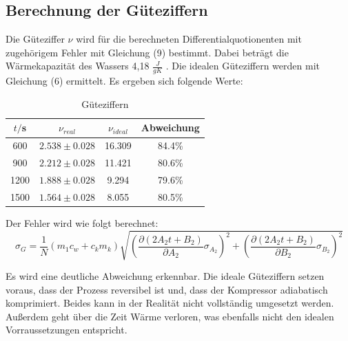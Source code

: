 \subsection{Berechnung der Güteziffern}
Die Güteziffer $\nu$ wird für die berechneten Differentialquotionenten mit zugehörigem Fehler mit Gleichung (9) bestimmt.
Dabei beträgt die Wärmekapazität des Wassers 4,18 $\frac{J}{gK}$ \cite{sample1}.
Die idealen Güteziffern werden mit Gleichung (6)
ermittelt. Es ergeben sich folgende Werte:
\begin{table}
  \centering
  \caption{Güteziffern}
  \label{tab:Reale und ideale Güteziffern}
  \begin{tabular}{c c c c}
    \toprule
    $t/$s & $\nu_{real}$ & $\nu_{ideal}$ & Abweichung \\
    \midrule
     600 & $2.538 \pm 0.028$ &   16.309 &  84.4\% \\
     900 & $2.212 \pm 0.028$ &   11.421 &  80.6\% \\
    1200 & $1.888 \pm 0.028$ &    9.294 &  79.6\% \\
    1500 & $1.564 \pm 0.028$ &    8.055 &  80.5\% \\
    \bottomrule
  \end{tabular}
\end{table}

Der Fehler wird wie folgt berechnet:
\begin{equation}
  \sigma_G = \frac{1}{N}(m_1c_w + c_km_k)\sqrt{
      \left( \frac{\partial(2A_2t + B_2)}{\partial A_2} \sigma_{A_2} \right)^{\!\! 2} +
      \left( \frac{\partial \left( 2A_2t + B_2 \right)}{\partial B_2} \sigma_{B_2} \right)^{\!\! 2}
    }
\end{equation}


Es wird eine deutliche Abweichung erkennbar. Die ideale Güteziffern setzen
voraus, dass der Prozess reversibel ist und, dass der Kompressor adiabatisch
komprimiert. Beides kann in der Realität nicht vollständig umgesetzt werden. Außerdem
geht über die Zeit Wärme verloren, was ebenfalls nicht den idealen Vorraussetzungen entspricht.
